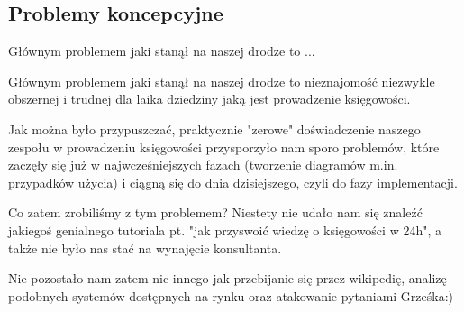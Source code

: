 \documentclass{beamer}
\begin{document}
\subsection{Problemy koncepcyjne}
  \begin{frame}
    \begin{block}{}
      Głównym problemem jaki stanął na naszej drodze to ...
    \end{block}
  \end{frame}
  \begin{frame}
    \begin{block}{}
      Głównym problemem jaki stanął na naszej drodze to nieznajomość niezwykle obszernej i trudnej dla laika dziedziny jaką jest prowadzenie księgowości.
    \end{block}
  \end{frame}
  \begin{frame}
    \begin{block}{}
      Jak można było przypuszczać, praktycznie "zerowe" doświadczenie naszego zespołu w prowadzeniu księgowości przysporzyło nam sporo problemów, które zaczęły się już w najwcześniejszych fazach (tworzenie diagramów m.in. przypadków użycia) i ciągną się do dnia dzisiejszego, czyli do fazy implementacji.
    \end{block}
  \end{frame}
  \begin{frame}
    \begin{block}{}
      Co zatem zrobiliśmy z tym problemem? Niestety nie udało nam się znaleźć jakiegoś genialnego tutoriala pt. "jak przyswoić wiedzę o księgowości w 24h", a także nie było nas stać na wynajęcie konsultanta.
    \end{block}
  \end{frame}
  \begin{frame}
    \begin{block}{}
      Nie pozostało nam zatem nic innego jak przebijanie się przez wikipedię, analizę podobnych systemów dostępnych na rynku oraz atakowanie pytaniami Grześka:)
    \end{block}
  \end{frame}
\end{document}
